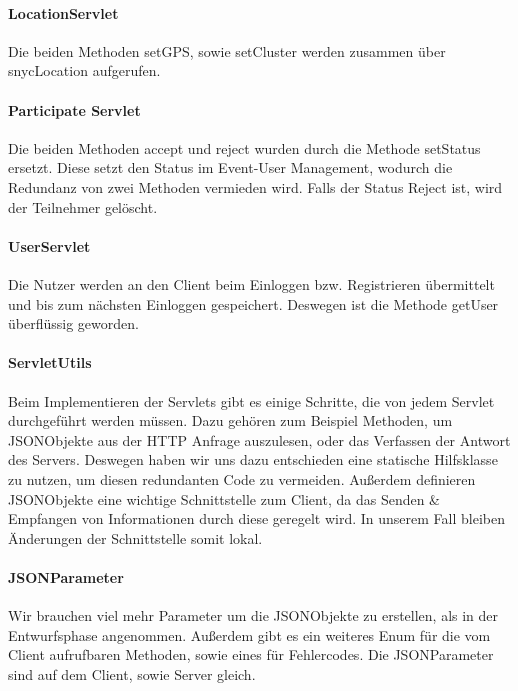 \documentclass{scrartcl}
\begin{document}
	\paragraph{LocationServlet}
	Die beiden Methoden setGPS, sowie setCluster werden zusammen über snycLocation aufgerufen. %
	
	\paragraph{Participate Servlet}
	Die beiden Methoden accept und reject wurden durch die Methode setStatus ersetzt. Diese setzt den Status im Event-User Management, wodurch die Redundanz von zwei Methoden vermieden wird. Falls der Status Reject ist, wird der Teilnehmer gelöscht. 
	
	\paragraph{UserServlet}
	Die Nutzer werden an den Client beim Einloggen bzw. Registrieren übermittelt und bis zum nächsten Einloggen gespeichert. Deswegen ist die Methode getUser überflüssig geworden.
	
	\paragraph{ServletUtils}
	Beim Implementieren der Servlets gibt es einige Schritte, die von jedem Servlet durchgeführt werden müssen. Dazu gehören zum Beispiel Methoden, um JSONObjekte aus der HTTP Anfrage auszulesen, oder das Verfassen der Antwort des Servers.
	Deswegen haben wir uns dazu entschieden eine statische Hilfsklasse zu nutzen, um diesen redundanten Code zu vermeiden. Außerdem definieren JSONObjekte eine wichtige Schnittstelle zum Client, da das Senden \& Empfangen von Informationen durch diese geregelt wird. In unserem Fall bleiben Änderungen der Schnittstelle somit lokal.
	
	\paragraph{JSONParameter}
	Wir brauchen viel mehr Parameter um die JSONObjekte zu erstellen, als in der Entwurfsphase angenommen. Außerdem gibt es ein weiteres Enum für die vom Client aufrufbaren Methoden, sowie eines für Fehlercodes. Die JSONParameter sind auf dem Client, sowie Server gleich. 
		
\end{document}
